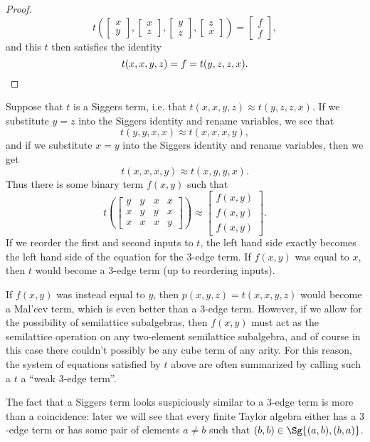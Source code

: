 \begin{proof}
\[
t\left(\begin{bmatrix} x\\ y\end{bmatrix}, \begin{bmatrix} x\\ z\end{bmatrix}, \begin{bmatrix} y\\ z\end{bmatrix}, \begin{bmatrix} z\\ x\end{bmatrix}\right) = \begin{bmatrix} f\\ f\end{bmatrix},
\]
and this $t$ then satisfies the identity
\[
t(x,x,y,z) = f = t(y,z,z,x).\qedhere
\]
\end{proof}

\begin{rem} Suppose that $t$ is a Siggers term, i.e. that $t(x,x,y,z) \approx t(y,z,z,x)$. If we substitute $y=z$ into the Siggers identity and rename variables, we see that
\[
t(y,y,x,x) \approx t(x,x,x,y),
\]
and if we substitute $x=y$ into the Siggers identity and rename variables, then we get
\[
t(x,x,x,y) \approx t(x,y,y,x).
\]
Thus there is some binary term $f(x,y)$ such that
\[
t\left(\begin{bmatrix}y & y & x & x\\ x & y & y & x\\ x & x & x & y\end{bmatrix}\right) \approx \begin{bmatrix}f(x,y)\\f(x,y)\\f(x,y)\end{bmatrix}.
\]
If we reorder the first and second inputs to $t$, the left hand side exactly becomes the left hand side of the equation for the $3$-edge term. If $f(x,y)$ was equal to $x$, then $t$ would become a $3$-edge term (up to reordering inputs).

If $f(x,y)$ was instead equal to $y$, then $p(x,y,z) = t(x,x,y,z)$ would become a Mal'cev term, which is even better than a $3$-edge term. However, if we allow for the possibility of semilattice subalgebras, then $f(x,y)$ must act as the semilattice operation on any two-element semilattice subalgebra, and of course in this case there couldn't possibly be any cube term of any arity. For this reason, the system of equations satisfied by $t$ above are often summarized by calling such a $t$ a ``weak $3$-edge term''.

The fact that a Siggers term looks suspiciously similar to a $3$-edge term is more than a coincidence: later we will see that every finite Taylor algebra either has a $3$-edge term or has some pair of elements $a \ne b$ such that $(b,b) \in \Sg\{(a,b),(b,a)\}$.
\end{rem}

